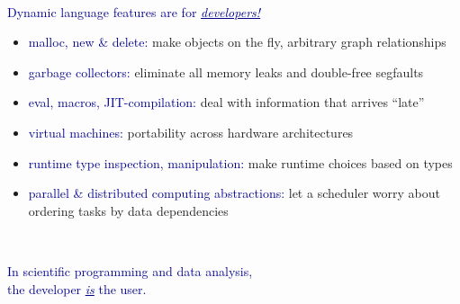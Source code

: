 \documentclass[aspectratio=169]{beamer}
\begin{document}
\begin{frame}{\mbox{ }}
\LARGE
\begin{center}
\textcolor{darkblue}{Dynamic language features are for \underline{\it developers!}}
\end{center}

\vspace{0.3 cm}
\large
\begin{itemize}\setlength{\itemsep}{0.2 cm}
\item<2-> \textcolor{darkblue}{malloc, new \& delete:} make objects on the fly, arbitrary graph relationships
\item<3-> \textcolor{darkblue}{garbage collectors:} eliminate all memory leaks and double-free segfaults
\item<4-> \textcolor{darkblue}{eval, macros, JIT-compilation:} deal with information that arrives ``late''
\item<5-> \textcolor{darkblue}{virtual machines:} portability across hardware architectures
\item<6-> \textcolor{darkblue}{runtime type inspection, manipulation:} make runtime choices based on types
\item<7-> \textcolor{darkblue}{parallel \& distributed computing abstractions:} let a scheduler worry about ordering tasks by data dependencies
\end{itemize}
\end{frame}

\begin{frame}{\mbox{ }}
\LARGE
\begin{center}
\textcolor{darkblue}{In scientific programming and data analysis, \\ the developer \underline{\it is} the user.}
\end{center}
\end{frame}

\begin{frame}{\mbox{ }}

\end{frame}
\end{document}
